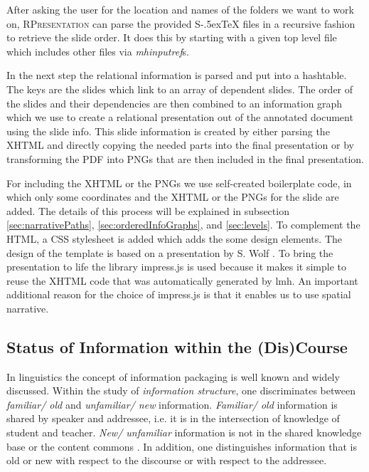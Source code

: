 \documentclass{llncs}
\def\stex{\texorpdfstring{\raisebox{-.5ex}S\kern-.5ex\TeX}{sTeX}\xspace}
\newcommand{\sys}{\textsc{RPresentation}\xspace}
\begin{document}
After asking the user for the location and names of the folders we want to work on, \sys can parse the provided \stex files in a recursive fashion to retrieve the slide order. It does this by starting with a given top level file which includes other files via \textit{mhinputref}s.

In the next step the relational information is parsed and put into a hashtable. The keys are the slides which link to an array of dependent slides. The order of the slides and their dependencies are then combined to an information graph which we use to create a relational presentation out of the annotated document using the slide info. This slide information is created by either parsing the XHTML and directly copying the needed parts into the final presentation or by transforming the PDF into PNGs that are then included in the final presentation.

For including the XHTML or the PNGs we use self-created boilerplate code, in which only some coordinates and the XHTML or the PNGs for the slide are added. The details of this process will be explained in subsection \ref{sec:narrativePaths}, \ref{sec:orderedInfoGraphs}, and \ref{sec:levels}. To complement the HTML, a CSS stylesheet is added which adds the some design elements. The design of the template is based on a presentation by S. Wolf \cite{Wolf:npentrel15}. To bring the presentation to life the library impress.js is used because it makes it simple to reuse the XHTML code that was automatically generated by lmh. An important additional reason for the choice of impress.js \cite{JSImpress:npentrel14} is that it enables us to use spatial narrative.

\subsection{Status of Information within the (Dis)Course}
\label{sec:infostatus}
In linguistics the concept of information packaging \cite{CambridgeGrammar:npentrel14} is well known and widely discussed. Within the study of \textit{information structure}, one discriminates between \textit{familiar/ old} and \textit{unfamiliar/ new} information. \textit{Familiar/ old} information is shared by speaker and addressee, i.e. it is in the intersection of knowledge of student and teacher. \textit{New/ unfamiliar} information is not in the shared knowledge base or the content commons \cite{CNX:whitepaper}. In addition, one distinguishes information that is old or new with respect to the discourse or with respect to the addressee.
\end{document}
